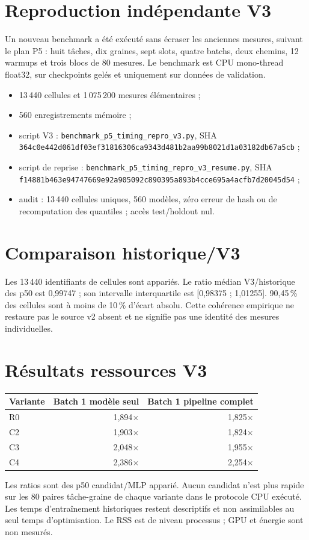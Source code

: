 \documentclass[11pt,a4paper]{article}
\begin{document}
\section{Reproduction indépendante V3}
Un nouveau benchmark a été exécuté sans écraser les anciennes mesures, suivant le plan P5 : huit tâches, dix graines, sept slots, quatre batchs, deux chemins, 12 warmups et trois blocs de 80 mesures. Le benchmark est CPU mono-thread float32, sur checkpoints gelés et uniquement sur données de validation.
\begin{itemize}
\item 13\,440 cellules et 1\,075\,200 mesures élémentaires ;
\item 560 enregistrements mémoire ;
\item script V3 : \texttt{benchmark\_p5\_timing\_repro\_v3.py}, SHA \texttt{364c0e442d061df03ef31816306ca9343d481b2aa99b8021d1a03182db67a5cb} ;
\item script de reprise : \texttt{benchmark\_p5\_timing\_repro\_v3\_resume.py}, SHA \texttt{f14881b463e94747669e92a905092c890395a893b4cce695a4acfb7d20045d54} ;
\item audit : 13\,440 cellules uniques, 560 modèles, zéro erreur de hash ou de recomputation des quantiles ; accès test/holdout nul.
\end{itemize}
\section{Comparaison historique/V3}
Les 13\,440 identifiants de cellules sont appariés. Le ratio médian V3/historique des p50 est 0,99747 ; son intervalle interquartile est [0,98375 ; 1,01255]. 90,45\,\% des cellules sont à moins de 10\,\% d'écart absolu. Cette cohérence empirique ne restaure pas le source v2 absent et ne signifie pas une identité des mesures individuelles.
\section{Résultats ressources V3}
\begin{center}
\begin{tabular}{lrr}
\toprule
Variante & Batch 1 modèle seul & Batch 1 pipeline complet\\
\midrule
R0 & 1,894$\times$ & 1,825$\times$\\
C2 & 1,903$\times$ & 1,824$\times$\\
C3 & 2,048$\times$ & 1,955$\times$\\
C4 & 2,386$\times$ & 2,254$\times$\\
\bottomrule
\end{tabular}
\end{center}
Les ratios sont des p50 candidat/MLP apparié. Aucun candidat n'est plus rapide sur les 80 paires tâche-graine de chaque variante dans le protocole CPU exécuté. Les temps d'entraînement historiques restent descriptifs et non assimilables au seul temps d'optimisation. Le RSS est de niveau processus ; GPU et énergie sont non mesurés.
\end{document}
